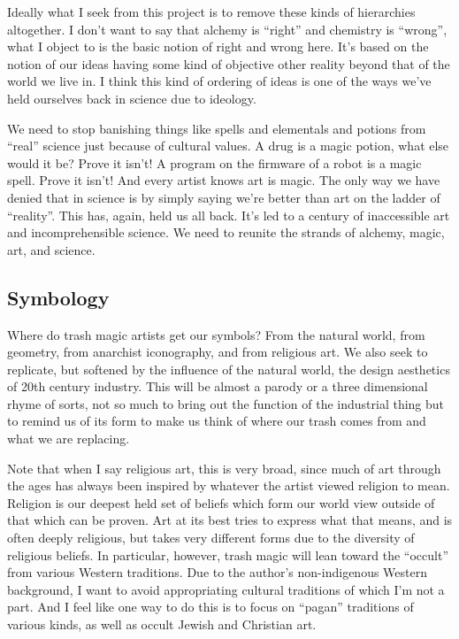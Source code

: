 Ideally what I seek from this project is to remove these kinds of
hierarchies altogether. I don't want to say that alchemy is ``right''
and chemistry is ``wrong'', what I object to is the basic notion of
right and wrong here. It's based on the notion of our ideas having some
kind of objective other reality beyond that of the world we live in. I
think this kind of ordering of ideas is one of the ways we've held
ourselves back in science due to ideology.

We need to stop banishing things like spells and elementals and potions
from ``real'' science just because of cultural values. A drug is a magic
potion, what else would it be? Prove it isn't! A program on the firmware
of a robot is a magic spell. Prove it isn't! And every artist knows art
is magic. The only way we have denied that in science is by simply
saying we're better than art on the ladder of ``reality''. This has,
again, held us all back. It's led to a century of inaccessible art and
incomprehensible science. We need to reunite the strands of alchemy,
magic, art, and science.

\subsection{Symbology}\label{symbology}

Where do trash magic artists get our symbols? From the natural world,
from geometry, from anarchist iconography, and from religious art. We
also seek to replicate, but softened by the influence of the natural
world, the design aesthetics of 20th century industry. This will be
almost a parody or a three dimensional rhyme of sorts, not so much to
bring out the function of the industrial thing but to remind us of its
form to make us think of where our trash comes from and what we are
replacing.

Note that when I say religious art, this is very broad, since much of
art through the ages has always been inspired by whatever the artist
viewed religion to mean. Religion is our deepest held set of beliefs
which form our world view outside of that which can be proven. Art at
its best tries to express what that means, and is often deeply
religious, but takes very different forms due to the diversity of
religious beliefs. In particular, however, trash magic will lean toward
the ``occult'' from various Western traditions. Due to the author's
non-indigenous Western background, I want to avoid appropriating
cultural traditions of which I'm not a part. And I feel like one way to
do this is to focus on ``pagan'' traditions of various kinds, as well as
occult Jewish and Christian art.

